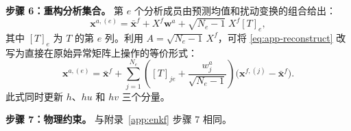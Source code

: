 \documentclass[12pt,a4paper]{article}
\newcommand{\x}{\bm{x}}
\newcommand{\w}{\bm{w}}
\begin{document}
\medskip\noindent
\textbf{步骤 6：重构分析集合。}
第 $e$ 个分析成员由预测均值和扰动变换的组合给出：
\begin{equation}
  \x^{a,(e)}
  = \bar{\x}^f
  + X^f \w^a
  + \sqrt{N_e-1}\; X^f [T]_e,
  \label{eq:app-reconstruct}
\end{equation}
其中 $[T]_e$ 为 $T$ 的第 $e$ 列。利用 $A = \sqrt{N_e-1}\,X^f$，可将
\eqref{eq:app-reconstruct} 改写为直接在原始异常矩阵上操作的等价形式：
\[
  \x^{a,(e)}
  = \bar{\x}^f
  + \sum_{j=1}^{N_e} \left(
      [T]_{j e} + \frac{w_j^a}{\sqrt{N_e-1}}
    \right)
    \bigl(\x^{f,(j)} - \bar{\x}^f\bigr).
\]
此式同时更新 $h$、$hu$ 和 $hv$ 三个分量。

\medskip\noindent
\textbf{步骤 7：物理约束。}
与附录~\ref{app:enkf} 步骤 7 相同。



\end{document}
